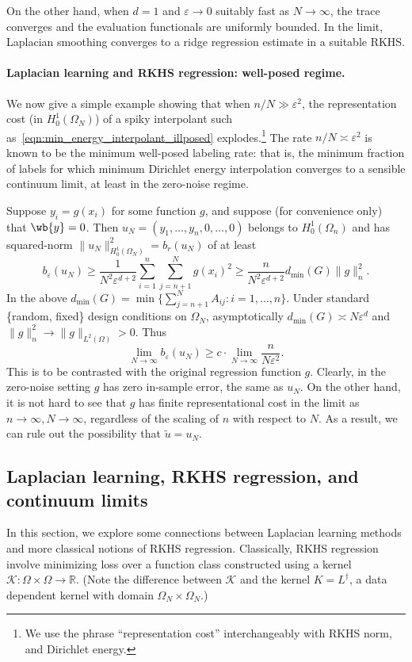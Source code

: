 \documentclass{article}
\newcommand{\Reals}{\mathbb{R}}
\newcommand{\1}{\mathbf{1}}
\newcommand{\Leb}{L}
\newcommand{\mc}[1]{\mathcal{#1}}
\newcommand{\wt}[1]{\widetilde{#1}}
\theoremstyle{definition}
\theoremstyle{remark}
\begin{document}
On the other hand, when $d = 1$ and $\varepsilon \to 0$ suitably fast as $N \to \infty$, the trace converges and the evaluation functionals are uniformly bounded. In the limit, Laplacian smoothing converges to a ridge regression estimate in a suitable RKHS. 

\paragraph{Laplacian learning and RKHS regression: well-posed regime.}
We now give a simple example showing that when $n/N \gg \varepsilon^2$, the representation cost (in $H_0^1(\Omega_N)$) of a spiky interpolant such as~\eqref{eqn:min_energy_interpolant_illposed} explodes.\footnote{We use the phrase ``representation cost'' interchangeably with RKHS norm, and Dirichlet energy.} The rate $n/N \asymp \varepsilon^2$ is known to be the minimum well-posed labeling rate: that is, the minimum fraction of labels for which minimum Dirichlet energy interpolation converges to a sensible continuum limit, at least in the zero-noise regime. 

Suppose $y_i = g(x_i)$ for some function $g$, and suppose (for convenience only) that $\wb{y} = 0$. Then $u_N = (y_1,\ldots,y_n, 0,\ldots,0)$ belongs to $H_0^1(\Omega_n)$ and has squared-norm $\|u_N\|_{H_0^1(\Omega_N)}^2 = b_r(u_N)$ of at least
\begin{equation*}
b_{\varepsilon}(u_N) \geq \frac{1}{N^2 \varepsilon^{d + 2}} \sum_{i = 1}^{n} \sum_{j = n + 1}^{N} g(x_i)^2 \geq \frac{n}{N^2 \varepsilon^{d + 2}} d_{\min}(G) \|g\|_n^2.
\end{equation*} 
In the above $d_{\min}(G) = \min\bigl\{\sum_{j = n + 1}^{N} A_{ij}: i = 1,\ldots,n\bigr\}$. Under standard \{random, fixed\} design conditions on $\Omega_N$, asymptotically $d_{\min}(G) \asymp N\varepsilon^d$ and $\|g\|_n^2 \to \|g\|_{\Leb^2(\Omega)} > 0$. Thus
\begin{equation*}
\lim_{N \to \infty} b_{\varepsilon}(u_N) \geq c \cdot \lim_{N \to \infty} \frac{n}{N \varepsilon^2}.
\end{equation*}
This is to be contrasted with the original regression function $g$. Clearly, in the zero-noise setting $g$ has zero in-sample error, the same as $u_N$. On the other hand, it is not hard to see that $g$ has finite representational cost in the limit as $n \to \infty, N \to \infty$, regardless of the scaling of $n$ with respect to $N$. As a result, we can rule out the possibility that $\wt{u} = u_N$. 

\subsection{Laplacian learning, RKHS regression, and continuum limits}
\label{subsec:laplacian_learning_continuum_limits}
In this section, we explore some connections between Laplacian learning methods and more classical notions of RKHS regression. Classically, RKHS regression involve minimizing loss over a function class constructed using a kernel $\mc{K}: \Omega \times \Omega \to \Reals$. (Note the difference between $\mc{K}$ and the kernel $K = L^{\dagger}$, a data dependent kernel with domain $\Omega_N \times \Omega_N$.)
\end{document}
